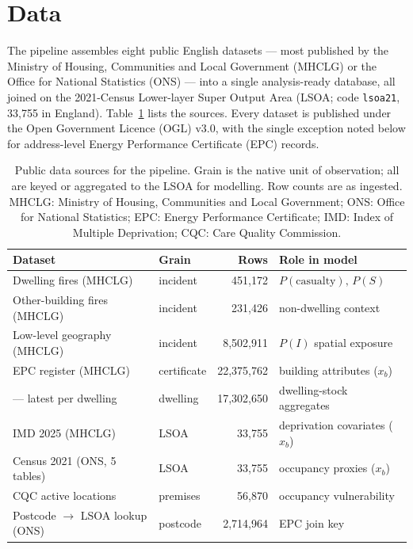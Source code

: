 \section{Data}
\label{sec:data}

The pipeline assembles eight public English datasets --- most published by the
Ministry of Housing, Communities and Local Government (MHCLG) or the Office for
National Statistics (ONS) --- into a single analysis-ready database, all joined on
the 2021-Census Lower-layer Super Output Area (LSOA; code \texttt{lsoa21},
33{,}755 in England). Table~\ref{tab:datasets} lists the sources. Every dataset is
published under the Open Government Licence (OGL) v3.0, with the single exception
noted below for address-level Energy Performance Certificate (EPC) records.

\begin{table}[htbp]
  \centering
  \caption{Public data sources for the pipeline. Grain is the native unit of
  observation; all are keyed or aggregated to the LSOA for modelling. Row counts
  are as ingested. MHCLG: Ministry of Housing, Communities and Local Government;
  ONS: Office for National Statistics; EPC: Energy Performance Certificate;
  IMD: Index of Multiple Deprivation; CQC: Care Quality Commission.}
  \label{tab:datasets}
  \small
  \begin{tabular}{@{}llrl@{}}
    \toprule
    Dataset & Grain & Rows & Role in model \\
    \midrule
    Dwelling fires (MHCLG) & incident & 451{,}172 & $P(\text{casualty}),\,P(S)$ \\
    Other-building fires (MHCLG) & incident & 231{,}426 & non-dwelling context \\
    Low-level geography (MHCLG) & incident & 8{,}502{,}911 & $P(I)$ spatial exposure \\
    EPC register (MHCLG) & certificate & 22{,}375{,}762 & building attributes ($x_b$) \\
    \quad --- latest per dwelling & dwelling & 17{,}302{,}650 & dwelling-stock aggregates \\
    IMD 2025 (MHCLG) & LSOA & 33{,}755 & deprivation covariates ($x_b$) \\
    Census 2021 (ONS, 5 tables) & LSOA & 33{,}755 & occupancy proxies ($x_b$) \\
    CQC active locations & premises & 56{,}870 & occupancy vulnerability \\
    Postcode $\to$ LSOA lookup (ONS) & postcode & 2{,}714{,}964 & EPC join key \\
    \bottomrule
  \end{tabular}
\end{table}

